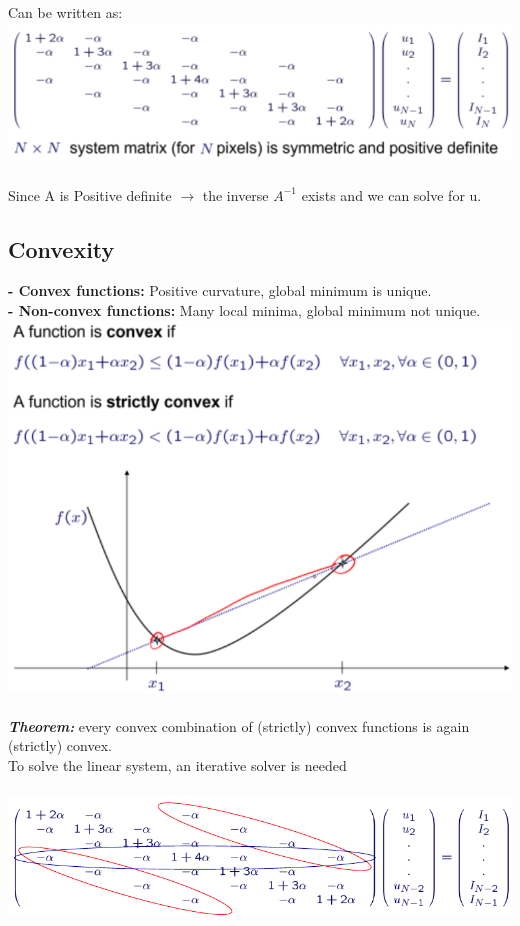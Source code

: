 \documentclass{article}
\begin{document}
Can be written as:\\
\includegraphics[scale=0.3]{31.png}\\\\
Since A is Positive definite $\rightarrow$ the inverse $A^{-1}$  exists and we can solve for u.\\
\subsection{Convexity}
\textbf{- Convex functions:} Positive curvature, global minimum is unique.\\
\textbf{- Non-convex functions:} Many local minima, global minimum not unique.\\
\includegraphics[scale=0.3]{32.png}\\\\
\textit{\textbf{Theorem:}} every convex combination of (strictly) convex functions is again (strictly) convex.\\
To solve the linear system, an iterative solver is needed\\\\
\includegraphics[scale=0.3]{33.png}
\end{document}
